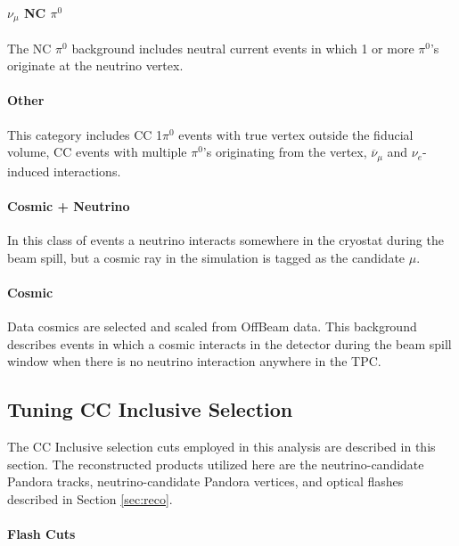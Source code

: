 \paragraph{  $\nu_\mu$ NC $\pi^0$}
The NC $\pi^0$ background includes neutral current events in which 1 or more $\pi^0$'s originate at the neutrino vertex.  

\paragraph{ Other}
This category includes CC 1$\pi^0$ events with true vertex outside the fiducial volume, CC events with multiple $\pi^0$'s originating from the vertex, $\overline{\nu}_\mu$ and $\nu_e$-induced interactions. 

\paragraph{ Cosmic + Neutrino }
In this class of events a neutrino interacts somewhere in the cryostat during the beam spill, but a cosmic ray in the simulation is tagged as the candidate $\mu$. 

\paragraph{Cosmic }
Data cosmics are selected and scaled from OffBeam data.  This background describes events in which a cosmic interacts in the detector during the beam spill window when there is no neutrino interaction anywhere in the TPC.  

\subsection{Tuning CC Inclusive Selection}
The CC Inclusive selection cuts employed in this analysis are described in this section. The reconstructed products utilized here are the neutrino-candidate Pandora tracks, neutrino-candidate Pandora vertices, and optical flashes described in Section \ref{sec:reco}. 

\paragraph{Flash Cuts}

